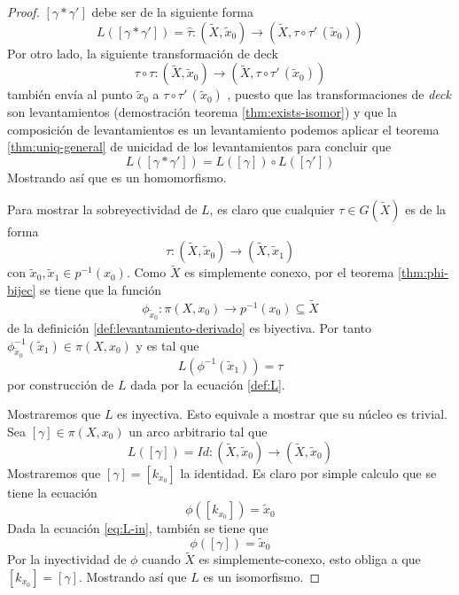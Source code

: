 \begin{proof}
  \([\gamma * \gamma']\) debe ser de la siguiente forma
  \[ L \left( [\gamma * \gamma'] \right) = \hat \tau : (\tilde X, \tilde
    x _0) \to (\tilde X , \tau \circ \tau' \, (\tilde x_0)) \]
  Por otro lado, la siguiente transformación de deck
  \[ \tau \circ \tau : (\tilde X, \tilde x _0) \to (\tilde X , \tau
    \circ \tau' \, (\tilde x_0))
  \]
  también envía al punto \(\tilde x_0\) a \(\tau \circ \tau' \, (\tilde
  x_0)\) , puesto que las transformaciones de \emph{deck} son
  levantamientos (demostración teorema \ref{thm:exists-isomor}) y que la
  composición de levantamientos es un levantamiento podemos aplicar el
  teorema \ref{thm:uniq-general} de unicidad de los levantamientos para
  concluir que
  \[ L \left( [\gamma * \gamma'] \right) = L \left( [\gamma] \right)
    \circ L \left( [\gamma'] \right)\]
  Mostrando así que es un homomorfismo.

  Para mostrar la sobreyectividad de \(L\), es claro que cualquier
  \(\tau \in G (\tilde X)\) es de la forma
  \[ \tau : (\tilde X, \tilde x_0) \to (\tilde X, \tilde x_1) \]
  con \(\tilde x_0, \tilde x_1 \in p^{-1} (x_0)\). Como \(\tilde X\) es
  simplemente conexo, por el teorema \ref{thm:phi-bijec} se tiene que la
  función
  \[\phi_{\tilde x_0} : \pi (X, x_0) \to p^{-1} (x_0) \subseteq \tilde
    X \]
  de la definición \ref{def:levantamiento-derivado} es
  biyectiva. Por tanto \(\phi_{\tilde x_0}^{-1} (\tilde x_1) \in \pi (X,
  x_0)\) y es tal que
  \[ L \left( \phi^{-1} (\tilde x_1) \right) = \tau \]
  por construcción de \(L\) dada por la ecuación \eqref{def:L}.

  Mostraremos que \(L\) es inyectiva. Esto equivale a mostrar que su
  núcleo es trivial. Sea \([\gamma] \in \pi (X , x_0)\) un arco
  arbitrario tal que
  \begin{equation} \label{eq:L-in}
    L \left( [\gamma] \right) = Id : (\tilde X , \tilde x_0) \to
      (\tilde X, \tilde x_0)
  \end{equation}
  Mostraremos que \([\gamma] = [k_{x_0}]\) la identidad. Es claro por
  simple calculo que se tiene la ecuación
  \[ \phi \left( [k_{x_0}] \right) = \tilde x _0 \]
  Dada la ecuación \eqref{eq:L-in}, también se tiene que
  \[ \phi \left( [\gamma] \right) = \tilde x_0 \]
  Por la inyectividad de \(\phi\) cuando \(\tilde X\) es
  simplemente-conexo, esto obliga a que \([k_{x_0}] = [\gamma]\).
  Mostrando así que \(L\) es un isomorfismo.
\end{proof}

